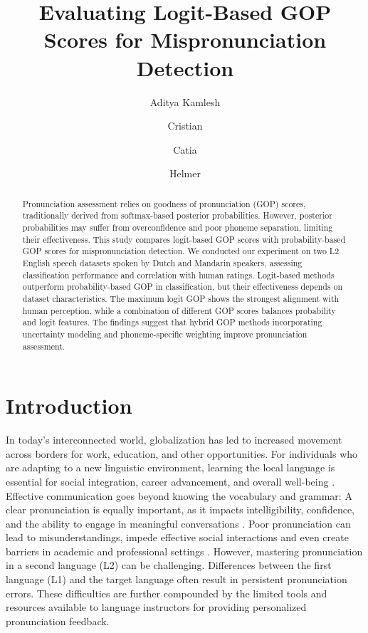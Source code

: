 \documentclass{Interspeech}
\title{Evaluating Logit-Based GOP Scores for Mispronunciation Detection}
\author{Aditya Kamlesh}{Parikh}
\author{Cristian}{Tejedor-Garcia}
\author{Catia}{Cucchiarini}
\author{Helmer}{Strik}
\affiliation[nocounter]{Centre for Language Studies}{Radboud University}{the Netherlands}
\begin{document}
\maketitle

\begin{abstract}
Pronunciation assessment relies on goodness of pronunciation (GOP) scores, traditionally derived from softmax-based posterior probabilities. However, posterior probabilities may suffer from overconfidence and poor phoneme separation, limiting their effectiveness. This study compares logit-based GOP scores with probability-based GOP scores for mispronunciation detection. We conducted our experiment on two L2 English speech datasets spoken by Dutch and Mandarin speakers, assessing classification performance and correlation with human ratings. Logit-based methods outperform probability-based GOP in classification, but their effectiveness depends on dataset characteristics. The maximum logit GOP shows the strongest alignment with human perception, while a combination of different GOP scores balances probability and logit features. The findings suggest that hybrid GOP methods incorporating uncertainty modeling and phoneme-specific weighting improve pronunciation assessment.
\end{abstract}




\section{Introduction}
\label{sec:Introduction}


In today's interconnected world, globalization has led to increased movement across borders for work, education, and other opportunities. For individuals who are adapting to a new linguistic environment, learning the local language is essential for social integration, career advancement, and overall well-being \cite{kuschel2023combining}. Effective communication goes beyond knowing the vocabulary and grammar: A clear pronunciation is equally important, as it impacts intelligibility, confidence, and the ability to engage in meaningful conversations \cite{reading101017,jenkins2000phonology}. Poor pronunciation can lead to misunderstandings, impede effective social interactions and even create barriers in academic and professional settings \cite{zossadult}. However, mastering pronunciation in a second language (L2) can be challenging. Differences between the first language (L1) and the target language often result in persistent pronunciation errors. These difficulties are further compounded by the limited tools and resources available to language instructors for providing personalized pronunciation feedback.
\end{document}
